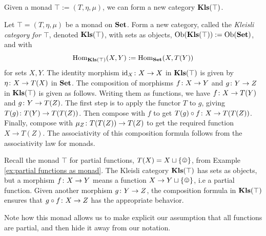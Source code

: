\documentclass[CT4S-EN-RU]{subfiles}
\begin{document}

\subsection{}\label{sec:kleisli}

\begin{blockENG}
Given a monad $\top:=(T,\eta,\mu)$, we can form a new category ${\mathbf{Kls}}(\top)$.
\end{blockENG}

\begin{blockRUS}
\end{blockRUS}

\begin{definitionENG}\label{def:kleisli}
Let $\top=(T,\eta,\mu)$ be a monad on ${\mathbf{Set}}$. Form a new category, called the {\em Kleisli category for $\top$}, denoted ${\mathbf{Kls}}(\top)$, with sets as objects, $\textnormal{Ob}({\mathbf{Kls}}(\top)):=\textnormal{Ob}({\mathbf{Set}})$, and with $$\textnormal{Hom}_{{\mathbf{Kls}}(\top)}(X,Y):=\textnormal{Hom}_{\mathbf{Set}}(X,T(Y))$$ for sets $X,Y$. The identity morphism $\textnormal{id}_X\colon X\rightarrow X$ in ${\mathbf{Kls}}(\top)$ is given by $\eta\colon X\rightarrow T(X)$ in ${\mathbf{Set}}$. The composition of morphisms $f\colon X\rightarrow Y$ and $g\colon Y\rightarrow Z$ in ${\mathbf{Kls}}(\top)$ is given as follows. Writing them as functions, we have $f\colon X\rightarrow T(Y)$ and $g\colon Y\rightarrow T(Z)$. The first step is to apply the functor $T$ to $g$, giving $T(g)\colon T(Y)\rightarrow T(T(Z))$. Then compose with $f$ to get $T(g)\circ f\colon X\rightarrow T(T(Z))$. Finally, compose with $\mu_Z\colon T(T(Z))\rightarrow T(Z)$ to get the required function $X\to T(Z)$. The associativity of this composition formula follows from the associativity law for monads.
\end{definitionENG}

\begin{definitionRUS}\label{def:kleisli}
\end{definitionRUS}

\begin{exampleENG}
Recall the monad $\top$ for partial functions, $T(X)=X\sqcup\singleton$, from Example \ref{ex:partial functions as monad}. The Kleisli category ${\mathbf{Kls}}(\top)$ has sets as objects, but a morphism $f\colon X\rightarrow Y$ means a function $X\to Y\sqcup\singleton$, i.e a partial function. Given another morphism $g\colon Y\rightarrow Z$, the composition formula in ${\mathbf{Kls}}(\top)$ ensures that $g\circ f\colon X\rightarrow Z$ has the appropriate behavior.

Note how this monad allows us to make explicit our assumption that all functions are partial, and then hide it away from our notation.
\end{exampleENG}
\end{document}
